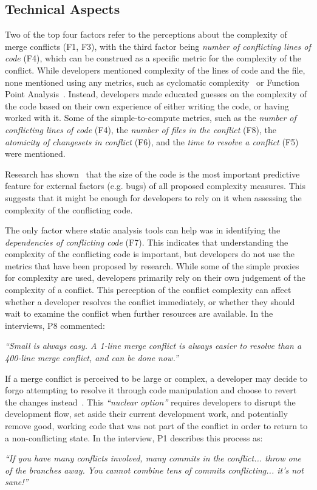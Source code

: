 \subsection{Technical Aspects}\label{artifact-based-factors}
Two of the top four factors refer to the perceptions about the complexity of merge conflicts (F1, F3), with the third factor being \textit{number of conflicting lines of code} (F4), which can be construed as a specific metric for the complexity of the conflict. 
While developers mentioned complexity of the lines of code and the file, none mentioned using any metrics, such as cyclomatic complexity~\cite{fenton2000quantitative,mccabe1976complexity} or Function Point Analysis~\cite{garmus2001fpa,symons1988function}. 
Instead, developers made educated guesses on the complexity of the code based on their own experience of either writing the code, or having worked with it. 
Some of the simple-to-compute metrics, such as the \textit{number of conflicting lines of code} (F4), the \textit{number of files in the conflict} (F8), the \textit{atomicity of changesets in conflict} (F6), and the \textit{time to resolve a conflict} (F5) were mentioned.

Research has shown~\cite{gil_correlation_2017} that the size of the code is the most important predictive feature for external factors (e.g. bugs) of all proposed complexity measures.
This suggests that it might be enough for developers to rely on it when assessing the complexity of the conflicting code.

The only factor where static analysis tools can help was in identifying the \textit{dependencies of conflicting code} (F7).
This indicates that understanding the complexity of the conflicting code is important, but developers do not use the metrics that have been proposed by research.
While some of the simple proxies for complexity are used, developers primarily rely on their own judgement of the complexity of a conflict.
This perception of the conflict complexity can affect whether a developer resolves the conflict immediately, or whether they should wait to examine the conflict when further resources are available. In the interviews, P8 commented:
\begin{quoting}
\textit{``Small is always easy. A 1-line merge conflict is always easier to resolve than a 400-line merge conflict, and can be done now.''}
\end{quoting}

If a merge conflict is perceived to be large or complex, a developer may decide to forgo attempting to resolve it through code manipulation and choose to revert the changes instead~\cite{Guzzi2015}.
This \emph{``nuclear option''} requires developers to disrupt the development flow, set aside their current development work, and potentially remove good, working code that was not part of the conflict in order to return to a non-conflicting state.
In the interview, P1 describes this process as:
\begin{quoting}
\textit{``If you have many conflicts involved, many commits in the conflict... throw one of the branches away. You cannot combine tens of commits conflicting... it's not sane!''}
\end{quoting}

